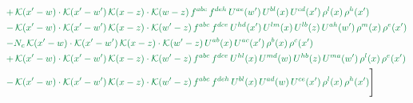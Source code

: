 \documentclass[10pt]{article}
\numberwithin{equation}{section}
\begin{document}
\begin{align}
&{\color{JIM} +\,\mathcal{K}(x'-w)\cdot\mathcal{K}(x'-w')\,\mathcal{K}(x-z)\cdot\mathcal{K}(w-z)\,f^{abc}\,f^{deh}\,U^{ae}(w')\,U^{bl}(x)\,U^{cd}(x')\,\rho^{l}(x)\,\rho^{h}(x')} \notag\\
&{\color{JIM} -\,\mathcal{K}(x'-w)\cdot\mathcal{K}(x'-w')\,\mathcal{K}(x-z)\cdot\mathcal{K}(w'-z)\,f^{abc}\,f^{dce}\,U^{hd}(x')\,U^{lm}(x)\,U^{lb}(z)\,U^{ah}(w')\,\rho^{m}(x)\,\rho^{e}(x')} \notag\\
&{\color{JIM} -N_{c}\,\mathcal{K}(x'-w)\cdot\mathcal{K}(x'-w')\,\mathcal{K}(x-z)\cdot\mathcal{K}(w'-z)\,U^{ab}(x)\,U^{ac}(x')\,\rho^{b}(x)\,\rho^{c}(x')} \notag\\
&{\color{JIM} +\,\mathcal{K}(x'-w)\cdot\mathcal{K}(x'-w')\,\mathcal{K}(x-z)\cdot\mathcal{K}(w'-z)\,f^{abc}\,f^{dce}\,U^{hl}(x)\,U^{md}(w)\,U^{hb}(z)\,U^{ma}(w')\,\rho^{l}(x)\,\rho^{e}(x')} \notag\\
&{\color{JIM} -\,\mathcal{K}(x'-w)\cdot\mathcal{K}(x'-w')\,\mathcal{K}(x-z)\cdot\mathcal{K}(w'-z)\,f^{abc}\,f^{deh}\,U^{bl}(x)\,U^{ad}(w)\,U^{ce}(x')\,\rho^{l}(x)\,\rho^{h}(x')}\Bigg] \end{align}
\end{document}
